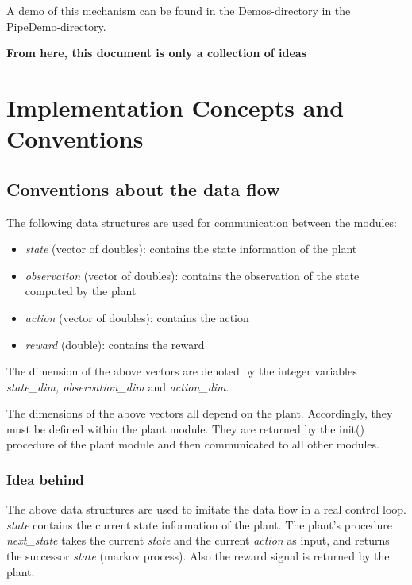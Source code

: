\documentclass[a4paper,12pt,german]{article}
\newcommand{\ite}{\begin{itemize}}
\newcommand{\eti}{\end{itemize}}
\begin{document}
A demo of this mechanism can be found in the Demos-directory in the PipeDemo-directory.





\newpage
\newpage

{\Huge \bf From here, this document is only a collection of ideas}

\newpage



\section{Implementation Concepts and Conventions}


\subsection{Conventions about the data flow}

The following data structures are used for communication between the modules:

\newcommand{\plantstate}{{\em state }} 
\newcommand{\observedstate}{{\em observation }}
\newcommand{\action}{{\em action }}

\ite
\item \plantstate (vector of doubles): contains the state information of the plant
\item \observedstate (vector of doubles): contains the observation of the state computed by the plant
\item \action (vector of doubles): contains the action
\item {\em reward} (double): contains the reward
\eti

The dimension of the above vectors are denoted by the integer variables 
{\em state\_dim, observation\_dim} and {\em action\_dim}. 

The dimensions of the above vectors all depend on the plant. Accordingly, they must be defined
within the plant module. They are returned by the init() procedure of the plant
module and then communicated to all other modules.

\subsubsection{Idea behind}

The above data structures are used to imitate the data flow in a real control loop.
\plantstate contains the current state information of the plant. 
The plant's procedure {\em next\_state} takes the 
current \plantstate and the current \action as input,
and returns the successor \plantstate (markov process). Also the reward signal
is returned by the plant. 
\end{document}
